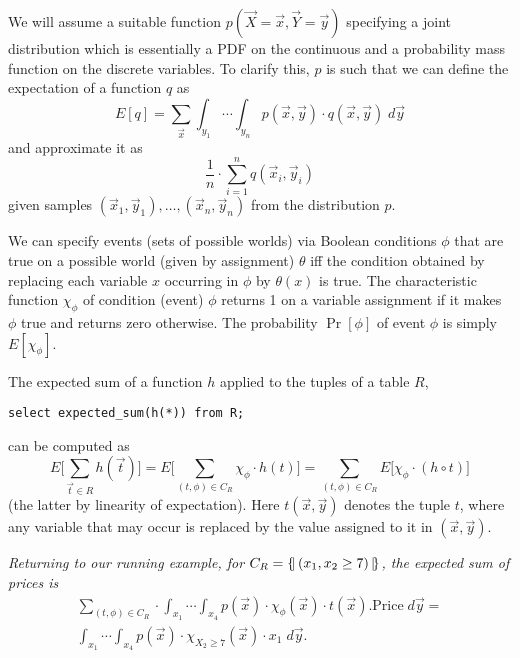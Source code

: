 We    will   assume    a    suitable   function    $p(\vec{X}=\vec{x},
\vec{Y}=\vec{y})$ specifying a joint distribution which is essentially
a  PDF  on the  continuous  and a  probability  mass  function on  the
discrete variables.  To clarify  this, $p$ is such that
we can define the expectation of a function $q$ as
\[
E[q] =
\sum_{\vec{x}} \int_{y_1} \cdots \int_{y_n}
p(\vec{x}, \vec{y}) \cdot q(\vec{x}, \vec{y}) \; d \vec{y}
\]
and approximate it as
\[
\frac{1}{n} \cdot \sum_{i=1}^n q(\vec{x}_i, \vec{y}_i)
\]
given samples $(\vec{x}_1, \vec{y}_1), \dots, (\vec{x}_n, \vec{y}_n)$ from
the distribution $p$.



We can specify events (sets of possible worlds) via Boolean conditions
$\phi$  that  are true  on  a  possible  world (given  by  assignment)
$\theta$  iff the condition  obtained by  replacing each  variable $x$
occurring  in  $\phi$  by  $\theta(x)$ is  true.   The  characteristic
function  $\chi_\phi$  of condition  (event)  $\phi$  returns  1 on  a
variable  assignment  if  it   makes  $\phi$  true  and  returns  zero
otherwise.   The probability  $\Pr[\phi]$  of event  $\phi$ is  simply
$E[\chi_\phi]$.

The expected  sum of a function $h$  applied to the tuples  of a table
$R$,
\begin{verbatim}
select expected_sum(h(*)) from R;
\end{verbatim}
can be computed as
\[
E \Big[ \sum_{\vec{t}  \in R}  h(\vec{t}) \Big]  =
E \Big[ \sum_{(t, \phi) \in C_R} \chi_\phi \cdot h(t) \Big] =
\sum_{(t, \phi) \in C_R} E \Big[ \chi_\phi \cdot (h \circ t) \Big]
\]
(the latter by linearity of expectation).
Here $t(\vec{x}, \vec{y})$ denotes
the tuple $t$, where any variable that may occur is replaced by
the value assigned to it in $(\vec{x}, \vec{y})$.


\begin{example}\em
Returning to our running example, for $C_R = \{\!|\, (x_1, x_2 \ge 7) \,|\!\}$, the expected sum of prices is
\begin{multline*}
   \sum_{(t,  \phi) \in  C_R} \cdot  
   \int_{x_1} \cdots
   \int_{x_4}  p(\vec{x})  \cdot  \chi_\phi(\vec{x})
   \cdot t(\vec{x}).\mathrm{Price} \; d \vec{y}
= \\
   \int_{x_1} \cdots
   \int_{x_4}  p(\vec{x})  \cdot  \chi_{X_2 \ge 7}(\vec{x})
   \cdot x_1 \; d \vec{y}.
\end{multline*}
\punto
\end{example}


